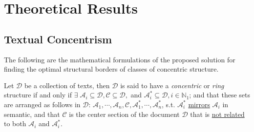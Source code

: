 \chapter{Theoretical Results}
\label{appendix:theoretical_results}
\section{Textual Concentrism}
The following are the mathematical formulations of the proposed solution for finding the optimal structural borders of classes of concentric structure.
\begin{defn}[\it Concentric]\label{defn:concentric}
    Let $\mathscr{D}$ be a collection of texts, then $\mathscr{D}$ is said to have a \textit{concentric} or \textit{ring} structure if and only if $\exists\;\mathscr{A}_i\subseteq\mathscr{D},\mathscr{C}\subseteq\mathscr{D},$ and $\mathscr{A}_i^{*}\subseteq\mathscr{D},i\in\mathbb{N}_1$; and that these sets are arranged as follows in $\mathscr{D}$:  $\mathscr{A}_1,\cdots,\mathscr{A}_n,\mathscr{C},\mathscr{A}_1^{*},\cdots,\mathscr{A}_n^{*}$, s.t. $\mathscr{A}_i^{*}$ \underline{mirrors} $\mathscr{A}_i$ in semantic, and that $\mathscr{C}$ is the center section of the document $\mathscr{D}$ that is \underline{not related} to both $\mathscr{A}_i$ and $\mathscr{A}_i^{*}$.
\end{defn}

